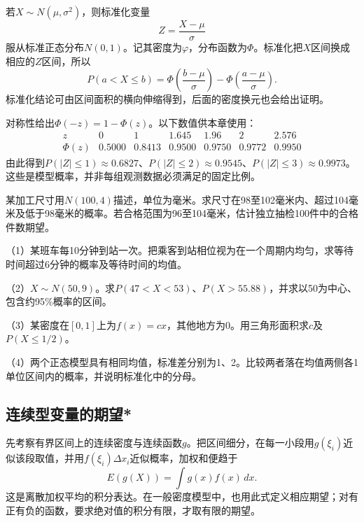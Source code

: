 若\(X\sim N(\mu,\sigma^2)\)，则{\heiti 标准化变量}
\[
 Z=\frac{X-\mu}{\sigma}
\]
服从标准正态分布\(N(0,1)\)。记其密度为\(\varphi\)，分布函数为\(\Phi\)。标准化把\(X\)区间换成相应的\(Z\)区间，所以
\begin{equation}\label{eq:prob-normal-standardization}
 P(a<X\le b)=\Phi\left(\frac{b-\mu}{\sigma}\right)
 -\Phi\left(\frac{a-\mu}{\sigma}\right).
\end{equation}
标准化结论可由区间面积的横向伸缩得到，后面的密度换元也会给出证明。

对称性给出\(\Phi(-z)=1-\Phi(z)\)。以下数值供本章使用：
\[
\begin{array}{c|rrrrrr}
z&0&1&1.645&1.96&2&2.576\\\hline
\Phi(z)&0.5000&0.8413&0.9500&0.9750&0.9772&0.9950
\end{array}
\]
由此得到\(P(|Z|\le1)\approx0.6827\)、\(P(|Z|\le2)\approx0.9545\)、\(P(|Z|\le3)\approx0.9973\)。这些是模型概率，并非每组观测数据必须满足的固定比例。

\begin{example}
某加工尺寸用\(N(100,4)\)描述，单位为毫米。求尺寸在98至102毫米内、超过104毫米及低于98毫米的概率。若合格范围为96至104毫米，估计独立抽检100件中的合格件数期望。
\end{example}

\begin{exercise}
\mbox{}\par\nobreak

（1）某班车每10分钟到站一次。把乘客到站相位视为在一个周期内均匀，求等待时间超过6分钟的概率及等待时间的均值。

（2）\(X\sim N(50,9)\)。求\(P(47<X<53)\)、\(P(X>55.88)\)，并求以50为中心、包含约95\%概率的区间。

（3）某密度在\([0,1]\)上为\(f(x)=cx\)，其他地方为0。用三角形面积求\(c\)及\(P(X\le1/2)\)。

（4）两个正态模型具有相同均值，标准差分别为1、2。比较两者落在均值两侧各1单位区间内的概率，并说明标准化中的分母。
\end{exercise}

\FloatBarrier
\newpage
\subsection{连续型变量的期望*}

先考察有界区间上的连续密度与连续函数\(g\)。把区间细分，在每一小段用\(g(\xi_i)\)近似该段取值，并用\(f(\xi_i)\Delta x_i\)近似概率，加权和便趋于
\begin{equation}\label{eq:prob-continuous-expectation}
 E(g(X))=\int g(x)f(x)\,dx.
\end{equation}
这是离散加权平均的积分表达。在一般密度模型中，也用此式定义相应期望；对有正有负的函数，要求绝对值的积分有限，才取有限的期望。

